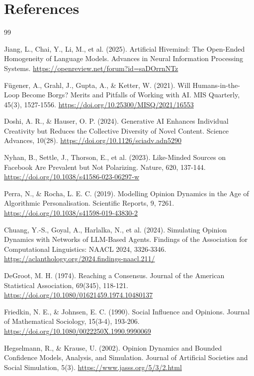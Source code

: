 \documentclass[11pt,a4paper]{article}
\begin{document}
\section*{References}
\RaggedRight
\sloppy

\begin{thebibliography}{99}
\setlength{\itemsep}{0.6em}

Jiang, L., Chai, Y., Li, M., et al. (2025). Artificial Hivemind: The Open-Ended Homogeneity of Language Models. Advances in Neural Information Processing Systems. \url{https://openreview.net/forum?id=saDOrrnNTz}

F\"ugener, A., Grahl, J., Gupta, A., \& Ketter, W. (2021). Will Humans-in-the-Loop Become Borgs? Merits and Pitfalls of Working with AI. MIS Quarterly, 45(3), 1527-1556. \url{https://doi.org/10.25300/MISQ/2021/16553}

Doshi, A. R., \& Hauser, O. P. (2024). Generative AI Enhances Individual Creativity but Reduces the Collective Diversity of Novel Content. Science Advances, 10(28). \url{https://doi.org/10.1126/sciadv.adn5290}

Nyhan, B., Settle, J., Thorson, E., et al. (2023). Like-Minded Sources on Facebook Are Prevalent but Not Polarizing. Nature, 620, 137-144. \url{https://doi.org/10.1038/s41586-023-06297-w}

Perra, N., \& Rocha, L. E. C. (2019). Modelling Opinion Dynamics in the Age of Algorithmic Personalisation. Scientific Reports, 9, 7261. \url{https://doi.org/10.1038/s41598-019-43830-2}

Chuang, Y.-S., Goyal, A., Harlalka, N., et al. (2024). Simulating Opinion Dynamics with Networks of LLM-Based Agents. Findings of the Association for Computational Linguistics: NAACL 2024, 3326-3346. \url{https://aclanthology.org/2024.findings-naacl.211/}

DeGroot, M. H. (1974). Reaching a Consensus. Journal of the American Statistical Association, 69(345), 118-121. \url{https://doi.org/10.1080/01621459.1974.10480137}

Friedkin, N. E., \& Johnsen, E. C. (1990). Social Influence and Opinions. Journal of Mathematical Sociology, 15(3-4), 193-206. \url{https://doi.org/10.1080/0022250X.1990.9990069}

Hegselmann, R., \& Krause, U. (2002). Opinion Dynamics and Bounded Confidence Models, Analysis, and Simulation. Journal of Artificial Societies and Social Simulation, 5(3). \url{https://www.jasss.org/5/3/2.html}


\end{thebibliography}
\end{document}
